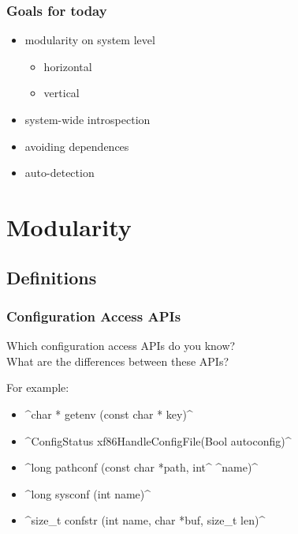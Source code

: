 \begin{frame}
	\frametitle{Goals for today}
	\begin{itemize}
	\item modularity on system level
	\begin{itemize}
	\item horizontal
	\item vertical
	\end{itemize}
	\item system-wide introspection
	\item avoiding dependences
	\item auto-detection
	\end{itemize}
\end{frame}




\section{Modularity}

\subsection{Definitions}

\begin{frame}
	\Large
\end{frame}

\begin{frame}[fragile]
	\frametitle{Configuration Access APIs}

	\begin{task}
	Which configuration access APIs do you know? \\
	What are the differences between these APIs?
	\end{task}

	For example:
	\begin{itemize}[<+-| alert@+>]
	\item ^char * getenv (const char * key)^
	\item ^ConfigStatus xf86HandleConfigFile(Bool autoconfig)^
	\item ^long pathconf (const char *path, int^ ^name)^
	\item ^long sysconf (int name)^
	\item ^size_t confstr (int name, char *buf, size_t len)^
	\end{itemize}
\end{frame}

